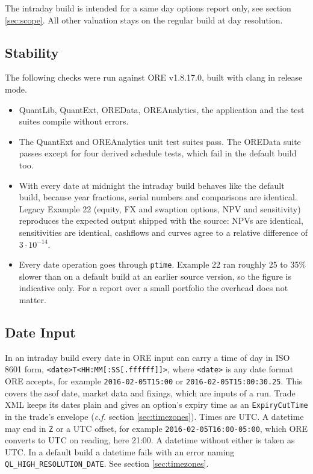 \documentclass[12pt, a4paper]{article}
\begin{document}
The intraday build is intended for a same day options report only, see section \ref{sec:scope}. All other valuation
stays on the regular build at day resolution.

\subsection{Stability}\label{sec:stability}

The following checks were run against ORE v1.8.17.0, built with clang in release mode.

\begin{itemize}
\item QuantLib, QuantExt, OREData, OREAnalytics, the application and the test suites compile without errors.
\item The QuantExt and OREAnalytics unit test suites pass. The OREData suite passes except for four derived schedule
  tests, which fail in the default build too.
\item With every date at midnight the intraday build behaves like the default build, because year fractions, serial
  numbers and comparisons are identical. Legacy Example 22 (equity, FX and swaption options, NPV and sensitivity)
  reproduces the expected output shipped with the source: NPVs are identical, sensitivities are identical, cashflows
  and curves agree to a relative difference of $3\cdot 10^{-14}$.
\item Every date operation goes through \texttt{ptime}. Example 22 ran roughly 25 to 35\% slower than on a default
  build at an earlier source version, so the figure is indicative only. For a report over a small portfolio the
  overhead does not matter.
\end{itemize}

\subsection{Date Input}\label{sec:dateinput}

In an intraday build every date in ORE input can carry a time of day in ISO 8601 form,
\texttt{<date>T<HH:MM[:SS[.ffffff]]>}, where \texttt{<date>} is any date format ORE accepts, for example
\texttt{2016-02-05T15:00} or \texttt{2016-02-05T15:00:30.25}. This covers the asof date, market data and fixings,
which are inputs of a run. Trade XML keeps its dates plain and gives an option's expiry time as an
\texttt{ExpiryCutTime} in the trade's envelope (\textit{c.f.} section \ref{sec:timezones}). Times are UTC. A datetime may end in \texttt{Z} or a UTC offset, for example \texttt{2016-02-05T16:00-05:00},
which ORE converts to UTC on reading, here 21:00. A datetime without either is taken as UTC. In a default build a
datetime fails with an error naming \texttt{QL\_HIGH\_RESOLUTION\_DATE}. See section \ref{sec:timezones}.
\end{document}
